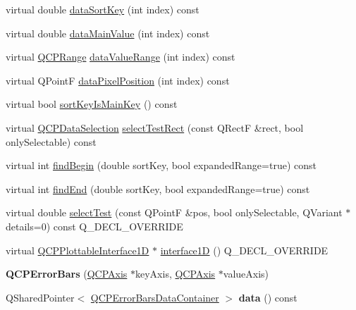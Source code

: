 \begin{DoxyCompactItemize}
\item 
virtual double \hyperlink{class_q_c_p_error_bars_ade1d7b893397eb0ebdaca79d3e2495f6}{data\+Sort\+Key} (int index) const 
\item 
virtual double \hyperlink{class_q_c_p_error_bars_a8b5e77ae65a36a79bc77ca7181658db1}{data\+Main\+Value} (int index) const 
\item 
virtual \hyperlink{class_q_c_p_range}{Q\+C\+P\+Range} \hyperlink{class_q_c_p_error_bars_ac724e15a2d8324228932217cea174392}{data\+Value\+Range} (int index) const 
\item 
virtual Q\+PointF \hyperlink{class_q_c_p_error_bars_a3c295ae2110a560c2c0071884e49713b}{data\+Pixel\+Position} (int index) const 
\item 
virtual bool \hyperlink{class_q_c_p_error_bars_acefa299acb305f8c274cb954bafaefa9}{sort\+Key\+Is\+Main\+Key} () const 
\item 
virtual \hyperlink{class_q_c_p_data_selection}{Q\+C\+P\+Data\+Selection} \hyperlink{class_q_c_p_error_bars_a8326840b9eb776e6f81855eb11286a36}{select\+Test\+Rect} (const Q\+RectF \&rect, bool only\+Selectable) const 
\item 
virtual int \hyperlink{class_q_c_p_error_bars_a7ed3c6ca95f809c26482cf5e655b381f}{find\+Begin} (double sort\+Key, bool expanded\+Range=true) const 
\item 
virtual int \hyperlink{class_q_c_p_error_bars_affdf813c2088a783f99a3363c99808bd}{find\+End} (double sort\+Key, bool expanded\+Range=true) const 
\item 
virtual double \hyperlink{class_q_c_p_error_bars_ac1b6675ef43e32547a3cbcf7b7ac46ed}{select\+Test} (const Q\+PointF \&pos, bool only\+Selectable, Q\+Variant $\ast$details=0) const Q\+\_\+\+D\+E\+C\+L\+\_\+\+O\+V\+E\+R\+R\+I\+DE
\item 
virtual \hyperlink{class_q_c_p_plottable_interface1_d}{Q\+C\+P\+Plottable\+Interface1D} $\ast$ \hyperlink{class_q_c_p_error_bars_a0b6fbf3a943b4241ee485d066cc8562a}{interface1D} () Q\+\_\+\+D\+E\+C\+L\+\_\+\+O\+V\+E\+R\+R\+I\+DE
\item 
{\bfseries Q\+C\+P\+Error\+Bars} (\hyperlink{class_q_c_p_axis}{Q\+C\+P\+Axis} $\ast$key\+Axis, \hyperlink{class_q_c_p_axis}{Q\+C\+P\+Axis} $\ast$value\+Axis)\hypertarget{class_q_c_p_error_bars_a5cdcc33e5f173780c3d657e96216e5c1}{}\label{class_q_c_p_error_bars_a5cdcc33e5f173780c3d657e96216e5c1}

\item 
Q\+Shared\+Pointer$<$ \hyperlink{class_q_vector}{Q\+C\+P\+Error\+Bars\+Data\+Container} $>$ {\bfseries data} () const \hypertarget{class_q_c_p_error_bars_a1c8206451629bd4432658cec0563738a}{}\label{class_q_c_p_error_bars_a1c8206451629bd4432658cec0563738a}


\end{DoxyCompactItemize}
